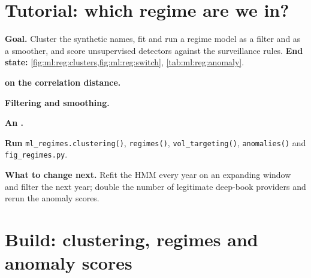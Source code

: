 \section{Tutorial: which regime are we in?}\label{tut:ml:clustering-regimes-and-anomaly-detection:tut}

\begin{tutorial}
\textbf{Goal.} Cluster the synthetic names, fit and run a regime model as a filter and as a smoother, and score unsupervised
detectors against the surveillance rules. \textbf{End state:} \cref{fig:ml:reg:clusters,fig:ml:reg:switch},
\cref{tab:ml:reg:anomaly}.
\begin{tutsteps}
\item \textbf{ on the correlation distance.}
\label{lst:ml:reg:hier}
\item \textbf{Filtering and smoothing.}
\label{lst:ml:reg:hmm}
\item \textbf{An .}
\label{lst:ml:reg:iforest}
\item \textbf{Run} \texttt{ml\_regimes.clustering()}, \texttt{regimes()}, \texttt{vol\_targeting()}, \texttt{anomalies()} and
\texttt{fig\_regimes.py}.
\end{tutsteps}
\textbf{What to change next.} Refit the HMM every year on an expanding window and filter the next year; double the number of
legitimate deep-book providers and rerun the anomaly scores.
\end{tutorial}

\section{Build: clustering, regimes and anomaly scores}\label{bld:ml:clustering-regimes-and-anomaly-detection:regimes}

